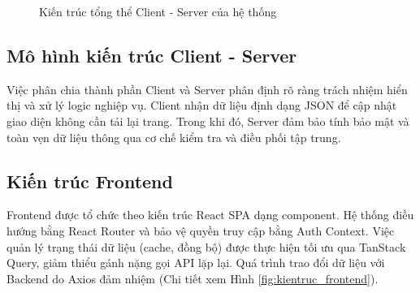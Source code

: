 \documentclass[12pt, a4paper]{report}
\begin{document}
\begin{figure}[htbp]
{
    }
    \caption{Kiến trúc tổng thể Client - Server của hệ thống}
    \label{fig:kientruc_tongthe}
\end{figure}

\subsection{Mô hình kiến trúc Client - Server}
Việc phân chia thành phần Client và Server phân định rõ ràng trách nhiệm hiển thị và xử lý logic nghiệp vụ. Client nhận dữ liệu định dạng JSON để cập nhật giao diện không cần tải lại trang. Trong khi đó, Server đảm bảo tính bảo mật và toàn vẹn dữ liệu thông qua cơ chế kiểm tra và điều phối tập trung.

\subsection{Kiến trúc Frontend}
Frontend được tổ chức theo kiến trúc React SPA dạng component. Hệ thống điều hướng bằng React Router và bảo vệ quyền truy cập bằng Auth Context. Việc quản lý trạng thái dữ liệu (cache, đồng bộ) được thực hiện tối ưu qua TanStack Query, giảm thiểu gánh nặng gọi API lặp lại. Quá trình trao đổi dữ liệu với Backend do Axios đảm nhiệm (Chi tiết xem Hình \ref{fig:kientruc_frontend}).
\end{document}
